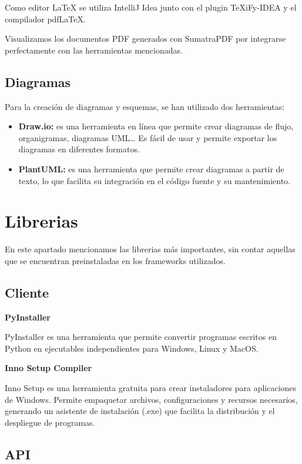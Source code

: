 Como editor LaTeX se utiliza IntelliJ Idea junto con el plugin TeXiFy-IDEA y el compilador pdfLaTeX.

Visualizamos los documentos PDF generados con SumatraPDF por integrarse perfectamente con las herramientas
mencionadas.

\subsection{Diagramas}\label{subsec:diagramas}

Para la creación de diagramas y esquemas, se han utilizado dos herramientas:
\begin{itemize}
    \item \textbf{Draw.io:} es una herramienta en línea que permite crear diagramas de flujo, organigramas,
    diagramas UML\ldots
    Es fácil de usar y permite exportar los diagramas en diferentes formatos.
    \item \textbf{PlantUML:} es una herramienta que permite crear diagramas a partir de texto, lo que facilita
    su integración en el código fuente y su mantenimiento.
\end{itemize}

\section{Librerias}\label{sec:librerias}

En este apartado mencionamos las librerias más importantes, sin contar aquellas que se encuentran preinstaladas en los
frameworks utilizados.

\subsection{Cliente}\label{subsec:librerias_cliente}

\textbf{PyInstaller}

PyInstaller\cite{pyinstaller:official} es una herramienta que permite convertir programas escritos en Python en ejecutables independientes para
Windows, Linux y MacOS.


\textbf{Inno Setup Compiler}

Inno Setup\cite{innosetup:official} es una herramienta gratuita para crear instaladores para aplicaciones de Windows.
Permite empaquetar archivos, configuraciones y recursos necesarios, generando un asistente de instalación (.exe) que
facilita la distribución y el despliegue de programas.

\subsection{API}\label{subsec:librerias_api}


